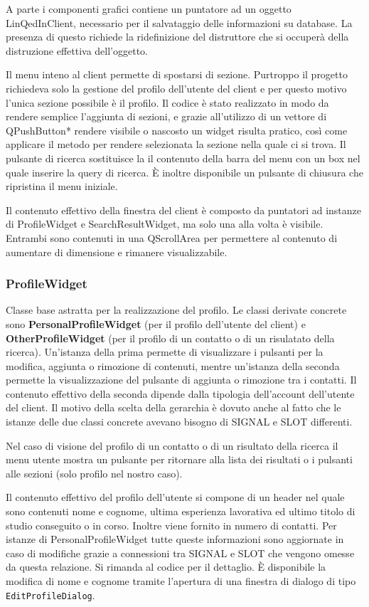 \documentclass[a4paper]{article}
\begin{document}
A parte i componenti grafici contiene un puntatore ad un oggetto LinQedInClient, necessario per il salvataggio delle informazioni su database. La presenza di questo richiede la ridefinizione del distruttore che si occuperà della distruzione effettiva dell'oggetto.

Il menu inteno al client permette di spostarsi di sezione. Purtroppo il progetto richiedeva solo la gestione del profilo dell'utente del client e per questo motivo l'unica sezione possibile è il profilo. Il codice è stato realizzato in modo da rendere semplice l'aggiunta di sezioni, e grazie all'utilizzo di un vettore di QPushButton* rendere visibile o nascosto un widget risulta pratico, così come applicare il metodo per rendere selezionata la sezione nella quale ci si trova. Il pulsante di ricerca sostituisce la il contenuto della barra del menu con un box nel quale inserire la query di ricerca. È inoltre disponibile un pulsante di chiusura che ripristina il menu iniziale.

Il contenuto effettivo della finestra del client è composto da puntatori ad instanze di ProfileWidget e SearchResultWidget, ma solo una alla volta è visibile. Entrambi sono contenuti in una QScrollArea per permettere al contenuto di aumentare di dimensione e rimanere visualizzabile.

\subsubsection*{ProfileWidget}
Classe base astratta per la realizzazione del profilo. Le classi derivate concrete sono \textbf{PersonalProfileWidget} (per il profilo dell'utente del client) e \textbf{OtherProfileWidget} (per il profilo di un contatto o di un risulatato della ricerca). Un'istanza della prima permette di visualizzare i pulsanti per la modifica, aggiunta o rimozione di contenuti, mentre un'istanza della seconda permette la visualizzazione del pulsante di aggiunta o rimozione tra i contatti. Il contenuto effettivo della seconda dipende dalla tipologia dell'account dell'utente del client. Il motivo della scelta della gerarchia è dovuto anche al fatto che le istanze delle due classi concrete avevano bisogno di SIGNAL e SLOT differenti.

Nel caso di visione del profilo di un contatto o di un risultato della ricerca il menu utente mostra un pulsante per ritornare alla lista dei risultati o i pulsanti alle sezioni (solo profilo nel nostro caso).

Il contenuto effettivo del profilo dell'utente si compone di un header nel quale sono contenuti nome e cognome, ultima esperienza lavorativa ed ultimo titolo di studio conseguito o in corso. Inoltre viene fornito in numero di contatti. Per istanze di PersonalProfileWidget tutte queste informazioni sono aggiornate in caso di modifiche grazie a connessioni tra SIGNAL e SLOT che vengono omesse da questa relazione. Si rimanda al codice per il dettaglio. È disponibile la modifica di nome e cognome tramite l'apertura di una finestra di dialogo di tipo \texttt{EditProfileDialog}.
\end{document}
